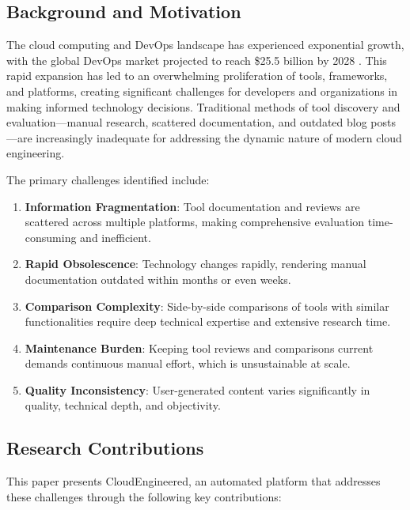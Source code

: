 \documentclass[conference]{IEEEtran}
\begin{document}
\subsection{Background and Motivation}

The cloud computing and DevOps landscape has experienced exponential growth, with the global DevOps market projected to reach \$25.5 billion by 2028 \cite{grandview2023}. This rapid expansion has led to an overwhelming proliferation of tools, frameworks, and platforms, creating significant challenges for developers and organizations in making informed technology decisions. Traditional methods of tool discovery and evaluation—manual research, scattered documentation, and outdated blog posts—are increasingly inadequate for addressing the dynamic nature of modern cloud engineering.

The primary challenges identified include:

\begin{enumerate}
    \item \textbf{Information Fragmentation}: Tool documentation and reviews are scattered across multiple platforms, making comprehensive evaluation time-consuming and inefficient.
    \item \textbf{Rapid Obsolescence}: Technology changes rapidly, rendering manual documentation outdated within months or even weeks.
    \item \textbf{Comparison Complexity}: Side-by-side comparisons of tools with similar functionalities require deep technical expertise and extensive research time.
    \item \textbf{Maintenance Burden}: Keeping tool reviews and comparisons current demands continuous manual effort, which is unsustainable at scale.
    \item \textbf{Quality Inconsistency}: User-generated content varies significantly in quality, technical depth, and objectivity.
\end{enumerate}

\subsection{Research Contributions}

This paper presents CloudEngineered, an automated platform that addresses these challenges through the following key contributions:
\end{document}
